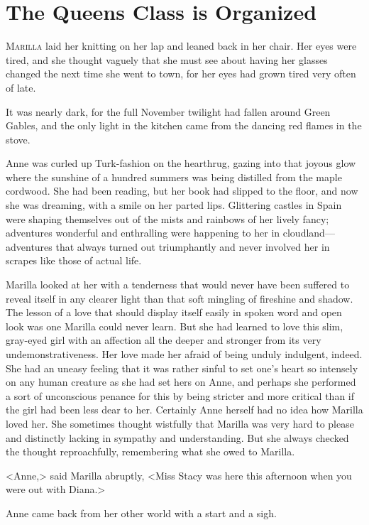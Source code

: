 \chapter{The Queens Class is Organized}

\lettrine{M}{arilla} laid her knitting on her lap and leaned back in her chair. Her eyes were tired, and she thought vaguely that she must see about having her glasses changed the next time she went to town, for her eyes had grown tired very often of late.

It was nearly dark, for the full November twilight had fallen around Green Gables, and the only light in the kitchen came from the dancing red flames in the stove.

Anne was curled up Turk-fashion on the hearthrug, gazing into that joyous glow where the sunshine of a hundred summers was being distilled from the maple cordwood. She had been reading, but her book had slipped to the floor, and now she was dreaming, with a smile on her parted lips. Glittering castles in Spain were shaping themselves out of the mists and rainbows of her lively fancy; adventures wonderful and enthralling were happening to her in cloudland—adventures that always turned out triumphantly and never involved her in scrapes like those of actual life.

Marilla looked at her with a tenderness that would never have been suffered to reveal itself in any clearer light than that soft mingling of fireshine and shadow. The lesson of a love that should display itself easily in spoken word and open look was one Marilla could never learn. But she had learned to love this slim, gray-eyed girl with an affection all the deeper and stronger from its very undemonstrativeness. Her love made her afraid of being unduly indulgent, indeed. She had an uneasy feeling that it was rather sinful to set one's heart so intensely on any human creature as she had set hers on Anne, and perhaps she performed a sort of unconscious penance for this by being stricter and more critical than if the girl had been less dear to her. Certainly Anne herself had no idea how Marilla loved her. She sometimes thought wistfully that Marilla was very hard to please and distinctly lacking in sympathy and understanding. But she always checked the thought reproachfully, remembering what she owed to Marilla.

<Anne,> said Marilla abruptly, <Miss Stacy was here this afternoon when you were out with Diana.>

Anne came back from her other world with a start and a sigh.

